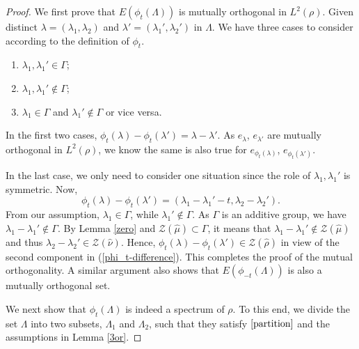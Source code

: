 \documentclass[reqno,a4paper,12pt]{amsart}
\numberwithin{equation}{section}
\theoremstyle{remark}
\numberwithin{equation}{section}
\begin{document}
\begin{proof}

We first prove that $E(\phi_t(\Lambda))$ is mutually orthogonal in $L^2(\rho)$. Given distinct $\lambda = (\lambda_1,\lambda_2)$ and $\lambda' = (\lambda_1',\lambda_2')$ in $\Lambda$. We have three cases to consider according to the definition of $\phi_t$. 
\begin{enumerate}
    \item  $\lambda_1,\lambda_1'\in\Gamma$;
    \item  $\lambda_1,\lambda_1'\not\in\Gamma$;
    \item  $\lambda_1\in\Gamma$ and $\lambda_1'\not\in \Gamma$ or vice versa. 
\end{enumerate}

In the first two cases, $\phi_t(\lambda)-\phi_t(\lambda') = \lambda-\lambda'$. As $e_{\lambda}$, $e_{\lambda'}$ are mutually orthogonal in $L^2(\rho)$, we know the same is also true for $e_{\phi_t(\lambda)}$, $e_{\phi_t(\lambda')}$.

In the last case, we only need to consider one situation since the role of $\lambda_1,\lambda_1'$ is symmetric.  Now,
\begin{equation}\label{phi_t-difference}
\phi_t(\lambda)-\phi_t(\lambda') = (\lambda_1-\lambda_1'-t,\lambda_2-\lambda_2').
\end{equation}
From our assumption, $\lambda_1\in \Gamma$, while $\lambda_1'\not\in \Gamma$. As  $\Gamma$ is an {additive} group, we have $\lambda_1-\lambda_1'\not\in\Gamma$. By Lemma \ref{zero} and ${\mathcal Z}(\widehat{\mu})\subset \Gamma$, it means that $\lambda_1-\lambda_1'\not\in{\mathcal Z}(\widehat{\mu})$ and thus $\lambda_2-\lambda_2'\in{\mathcal Z}(\widehat{\nu})$. Hence, $\phi_t(\lambda)-\phi_t(\lambda')\in {\mathcal Z}(\widehat{\rho})$ in view of the second component in (\ref{phi_t-difference}). This completes the proof of the mutual orthogonality. A similar argument also  shows that  $E(\phi_{-t}(\Lambda))$ is also a mutually orthogonal set. 


 We next show that $\phi_{t}(\Lambda)$ is indeed a spectrum of $\rho$. To this end, we  divide the set $\Lambda$ into two subsets, $\Lambda_{1}$ and $\Lambda_{2}$, such that they satisfy $\eqref{partition}$ and the assumptions in Lemma \ref{3or}.


\end{proof}
\end{document}
